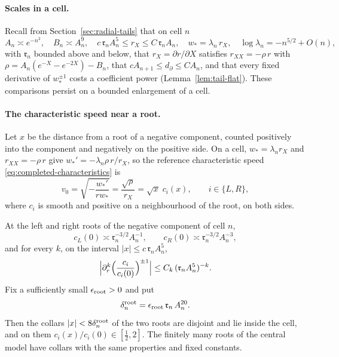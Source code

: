 \paragraph{Scales in a cell.}
Recall from Section~\ref{sec:radial-tails} that on cell $n$
\[
 A_n\asymp e^{-n^2},\quad B_n\asymp A_n^9,\quad
 c\,\mathfrak r_nA_n^5\le r_X\le C\,\mathfrak r_nA_n,\quad
 w_*=\lambda_n\,r_X,\quad \log\lambda_n=-n^{5/2}+O(n),
\]
with $\mathfrak r_n$ bounded above and below, that
$r_X=\partial r/\partial X$ satisfies $r_{XX}=-\rho\,r$ with
$\rho=A_n(e^{-X}-e^{-2X})-B_n$, that $cA_{n+1}\le d_\partial\le CA_n$,
and that every fixed derivative of $w_*^{\pm1}$ costs a coefficient
power (Lemma~\ref{lem:tail-flat}). These comparisons persist on a
bounded enlargement of a cell.

\paragraph{The characteristic speed near a root.}
Let $x$ be the distance from a root of a negative component, counted
positively into the component and negatively on the positive side. On
a cell, $w_*=\lambda_nr_X$ and $r_{XX}=-\rho\,r$ give
$w_*'=-\lambda_n\rho\,r/r_X$, so the reference characteristic speed
\eqref{eq:completed-characteristics} is
\[
 v_0=\sqrt{-\frac{w_*'}{rw_*}}=\frac{\sqrt\rho}{r_X}
 =\sqrt x\;c_i(x),\qquad i\in\{L,R\},
\]
where $c_i$ is smooth and positive on a neighbourhood of the root,
on both sides.

\begin{lemma}\label{lem:quantitative-root-collars}
At the left and right roots of the negative component of cell $n$,
\begin{equation}\label{eq:geometry-root-scales}
 c_L(0)\asymp\mathfrak r_n^{-3/2}A_n^{-1},\qquad
 c_R(0)\asymp\mathfrak r_n^{-3/2}A_n^{-3},
\end{equation}
and for every $k$, on the interval $|x|\le c\,\mathfrak r_nA_n^5$,
\begin{equation}\label{eq:geometry-normalized-root-jets}
 \Bigl|\partial_r^k\Bigl(\frac{c_i}{c_i(0)}\Bigr)^{\pm1}\Bigr|
 \le C_k\,(\mathfrak r_nA_n^5)^{-k}.
\end{equation}
Fix a sufficiently small $\epsilon_{\rm root}>0$ and put
\begin{equation}\label{eq:geometry-root-collar-width}
 \delta_n^{\rm root}=\epsilon_{\rm root}\,\mathfrak r_n\,A_n^{20}.
\end{equation}
Then the collars $|x|<8\delta_n^{\rm root}$ of the two roots are
disjoint and lie inside the cell, and on them
$c_i(x)/c_i(0)\in[\tfrac12,2]$. The finitely many roots of the central
model have collars with the same properties and fixed constants.
\end{lemma}

